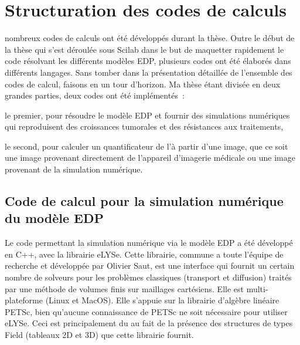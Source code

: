 \documentclass[main.tex]{subfiles}
\begin{document}
\chapter{Structuration des codes de calculs \label{chap:structure_code} }
 nombreux codes de calculs ont été développés durant la thèse. Outre le début de la thèse qui s'est déroulée sous Scilab dans le but de maquetter rapidement le code résolvant les différents modèles EDP, plusieurs codes ont été élaborés dans différents langages. 
Sans tomber dans la présentation détaillée de l'ensemble des codes de calcul,  %
faisons en un tour d'horizon. 
Ma thèse étant divisée en deux grandes parties, deux codes ont été 
implémentés~: 
\begin{myitemize}
\item le premier, pour résoudre le modèle EDP et fournir des simulations numériques qui reproduisent des croissances tumorales et des résistances aux traitements,
\item le second, pour calculer un quantificateur de l'\hetero à partir d'une image, que ce soit une image provenant directement de l'appareil d'imagerie médicale ou une image provenant de la simulation numérique.
\end{myitemize}  

\section{Code de calcul pour la simulation numérique du modèle EDP}
Le code permettant la simulation numérique via le modèle EDP a été développé en C++, avec la librairie eLYSe. Cette librairie, commune a toute l'équipe de recherche et développée par Olivier Saut, est une interface qui fournit un certain nombre de solveurs pour les problèmes classiques (transport et diffusion) traités par une méthode de volumes finis sur maillages cartésiens. Elle est multi-plateforme (Linux et MacOS). 
Elle s'appuie sur la librairie d'algèbre linéaire PETSc, bien qu'aucune connaissance de PETSc ne soit nécessaire pour utiliser eLYSe. 
Ceci est principalement du au fait de la présence des structures de types Field (tableaux 2D et 3D) que cette librairie fournit. 
\end{document}
